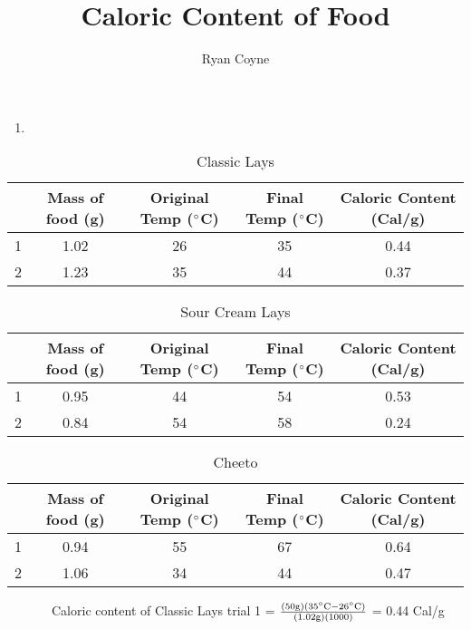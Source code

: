 \documentclass[12pt]{article}
\begin{document}
    \title{Caloric Content of Food}
    \author{Ryan Coyne}
    \maketitle
    \begin{enumerate}
        \item 
    \end{enumerate}
    \begin{table}[H]
    \caption{Classic Lays}
    \centering
        \begin{tabular}{c|cccc}
            & Mass of food (g) & Original Temp (\(\degree\)C) & Final Temp (\(\degree\)C) & Caloric Content (Cal/g)\\
            \hline
            1 & 1.02 & 26 & 35 & 0.44\\
            2 & 1.23 & 35 & 44 & 0.37\\
        \end{tabular}
    \end{table}
    \begin{table}[H]
        \caption{Sour Cream Lays}
        \centering
        \begin{tabular}{c|cccc}
            & Mass of food (g) & Original Temp (\(\degree\)C) & Final Temp (\(\degree\)C) & Caloric Content (Cal/g)\\
            \hline
            1 & 0.95 & 44 & 54 & 0.53\\
            2 & 0.84 & 54 & 58 & 0.24\\
        \end{tabular}
    \end{table}
    \begin{table}[H]
        \caption{Cheeto}
        \centering
            \begin{tabular}{c|cccc}
                & Mass of food (g) & Original Temp (\(\degree\)C) & Final Temp (\(\degree\)C) & Caloric Content (Cal/g)\\
                \hline
                1 & 0.94 & 55 & 67 & 0.64\\
                2 & 1.06 & 34 & 44 & 0.47\\
            \end{tabular}
        \end{table}
        ~~~~~~~Caloric content of Classic Lays trial 1 = \(\frac{(50 \mathrm{g})(35\degree\mathrm{C} - 26\degree\mathrm{C})}{(1.02 \mathrm{g})(1000)}\) = 0.44 Cal/g
\end{document}
